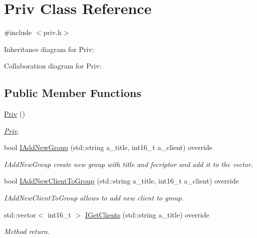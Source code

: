 \hypertarget{classPriv}{}\section{Priv Class Reference}
\label{classPriv}


{\ttfamily \#include $<$priv.\+h$>$}



Inheritance diagram for Priv\+:


Collaboration diagram for Priv\+:
\subsection*{Public Member Functions}
\begin{DoxyCompactItemize}
\item 
\hyperlink{classPriv_aadda11dccbb01f14e40797a4a3f62169}{Priv} ()\hypertarget{classPriv_aadda11dccbb01f14e40797a4a3f62169}{}\label{classPriv_aadda11dccbb01f14e40797a4a3f62169}

\begin{DoxyCompactList}\small\item\em \hyperlink{classPriv}{Priv}. \end{DoxyCompactList}\item 
bool \hyperlink{classPriv_ae4da67fa23671355729814f4d374a008}{I\+Add\+New\+Group} (std\+::string a\+\_\+title, int16\+\_\+t a\+\_\+client) override
\begin{DoxyCompactList}\small\item\em I\+Add\+New\+Group create new group with title and fecriptor and add it to the vector. \end{DoxyCompactList}\item 
bool \hyperlink{classPriv_a55467461c3e0607df0607e7a8cb0f028}{I\+Add\+New\+Client\+To\+Group} (std\+::string a\+\_\+title, int16\+\_\+t a\+\_\+client) override
\begin{DoxyCompactList}\small\item\em I\+Add\+New\+Client\+To\+Group allows to add new client to group. \end{DoxyCompactList}\item 
std\+::vector$<$ int16\+\_\+t $>$ \hyperlink{classPriv_a8830a49028aeb8162f3c1c4d7692edf5}{I\+Get\+Clients} (std\+::string a\+\_\+title) override
\begin{DoxyCompactList}\small\item\em Method return. \end{DoxyCompactList}\end{DoxyCompactItemize}


